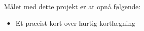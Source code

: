Målet med dette projekt er at opnå følgende:
\begin{itemize}
\item Et præcist kort over hurtig kortlægning
\end{itemize}
